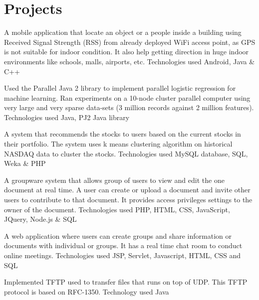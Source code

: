 \documentclass[]{main}
\begin{document}
\hfill
\begin{minipage}[t]{0.73\textwidth} 


\section{Projects}
\sectionsep

 
A mobile application that locate an object or a people inside a building using Received Signal Strength (RSS) from already deployed WiFi access point, as GPS is not suitable for indoor condition.
It also help getting direction in huge indoor environments like schools, malls, airports, etc.
Technologies used Android, Java \& C++
\sectionsep

 
Used the Parallel Java 2 library to implement parallel logistic regression for machine learning.
Ran experiments on a 10-node cluster parallel computer using very large and very sparse data-sets (3 million records against 2 million features).
Technologies used Java, PJ2 Java library
\sectionsep

 
A system that recommends the stocks to users based on the current stocks in their portfolio. 
The system uses k means clustering algorithm on historical NASDAQ data to cluster the stocks. 
Technologies used MySQL database, SQL, Weka \& PHP
\sectionsep

 
A groupware system that allows group of users to view and edit the one document at real time. 
A user can create or upload a document and invite other users to contribute to that document. 
It provides access privileges settings to the owner of the document.
Technologies used PHP, HTML, CSS, JavaScript, JQuery, Node.js \& SQL
\sectionsep

 
A web application where users can create groups and share information or documents with individual or groups.
It has a real time chat room to conduct online meetings.
Technologies used JSP, Servlet, Javascript, HTML, CSS and SQL
\sectionsep

 
Implemented TFTP used to transfer files that runs on top of UDP. This TFTP protocol is based on RFC-1350.
Technology used Java
\sectionsep

\end{minipage}
\end{document}
